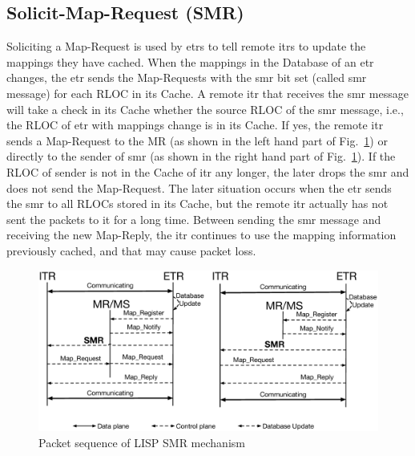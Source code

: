 \subsection{Solicit-Map-Request (SMR)}
\label{sec:SMR}
Soliciting a Map-Request is used by \acrshort{etr}s to tell remote \acrshort{itr}s to update the mappings they have cached. When the mappings in the Database of an \acrshort{etr} changes, the \acrshort{etr} sends the Map-Requests with the \acrshort{smr} bit set (called \acrfull{smr} message) for each RLOC in its Cache. A remote \acrshort{itr} that receives the \acrshort{smr} message will take a check in its Cache whether the source RLOC of the \acrshort{smr} message, i.e., the RLOC of \acrshort{etr} with mappings change is in its Cache. If yes, the remote \acrshort{itr} sends a Map-Request to the MR (as shown in the left hand part of Fig.~\ref{SMR_schema}) or directly to the sender of \acrshort{smr} (as shown in the right hand part of Fig.~\ref{SMR_schema}). %
If the RLOC of sender is not in the Cache of \acrshort{itr} any longer, the later drops the \acrshort{smr} and does not send the Map-Request. The later situation occurs when the \acrshort{etr} sends the \acrshort{smr} to all RLOCs stored in its Cache, but the remote \acrshort{itr} actually has not sent the packets to it for a long time. Between sending the \acrshort{smr} message and receiving the new Map-Reply, the \acrshort{itr} continues to use the mapping information previously cached, and that may cause packet loss.
\begin{figure}[!t]
	\centering
	\includegraphics[width=\textwidth]{Pics/SMR_schema.eps}
	\caption{Packet sequence of LISP SMR mechanism}
	\label{SMR_schema}
\end{figure}


